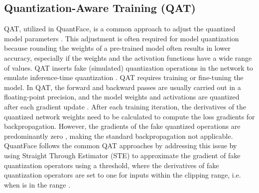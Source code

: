 \documentclass[a4paper,conference]{IEEEtran}
\begin{document}
\vspace{-1mm}
\subsection{Quantization-Aware Training (QAT)}
\vspace{-1mm}
QAT, utilized in QuantFace, is a common approach to adjust the quantized model parameters \cite{DBLP:conf/cvpr/WuLWHC16,DBLP:conf/cvpr/JacobKCZTHAK18}. This adjustment is often required for model quantization because rounding the weights of a pre-trained model often results in lower accuracy, especially if the weights and the activation functions have a wide range of values.
QAT inserts fake (simulated) quantization operations in the network to emulate inference-time quantization \cite{DBLP:conf/cvpr/JacobKCZTHAK18}. QAT requires training or fine-tuning the model. In QAT,  the forward and backward passes are usually carried out in a floating-point precision, and the model weights and activations are quantized after each gradient update \cite{DBLP:conf/cvpr/JacobKCZTHAK18}. 
After each training iteration, the derivatives of the quantized network weights need to be calculated to compute the loss gradients for backpropagation.
However, the gradients of the fake quantized operations are predominantly zero \cite{krishnamoorthi2018quantizing}, making the standard backpropagation not applicable. QuantFace follows the common QAT approaches \cite{krishnamoorthi2018quantizing,DBLP:conf/cvpr/JacobKCZTHAK18} by addressing this issue \textcolor{black}{by} using Straight Through Estimator (STE) \cite{DBLP:journals/corr/BengioLC13} to approximate the gradient of fake quantization operators using a threshold, where the derivatives of fake quantization operators are set to one for inputs within the clipping range, i.e. when  is in the range .


\vspace{-1mm}
\end{document}
